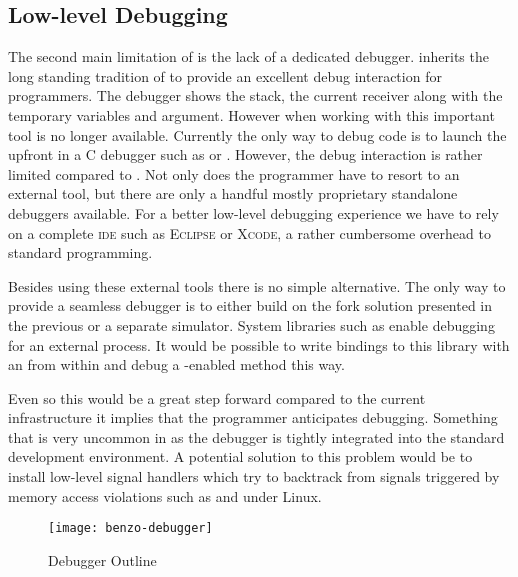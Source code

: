 \subsection{Low-level Debugging}
The second main limitation of \B is the lack of a dedicated debugger.
\PH inherits the long standing tradition of \ST to provide an excellent debug interaction for programmers.
The \PH debugger shows the stack, the current receiver along with the temporary variables and argument.
However when working with \B this important tool is no longer available.
Currently the only way to debug \B code is to launch the \VM upfront in a C debugger such as \GDB or \LLDB.
However, the debug interaction is rather limited compared to \PH.
Not only does the programmer have to resort to an external tool, but there are only a handful mostly proprietary standalone debuggers available.
For a better low-level debugging experience we have to rely on a complete \textsc{ide} such as \textsc{Eclipse} or \textsc{Xcode}, a rather cumbersome overhead to standard \PH programming.

Besides using these external tools there is no simple alternative.
The only way to provide a seamless debugger is to either build on the fork solution presented in the previous  or a separate simulator.
System libraries such as \ptrace enable debugging for an external process.
It would be possible to write bindings to this library with an \FFI from within \PH and debug a \B-enabled method this way.

Even so this would be a great step forward compared to the current infrastructure it implies that the programmer anticipates debugging.
Something that is very uncommon in \PH as the debugger is tightly integrated into the standard development environment.
A potential solution to this problem would be to install low-level signal handlers which try to backtrack from signals triggered by memory access violations such as  and  under Linux.

\begin{figure}[h]
	\centering
	\texttt{[image: benzo-debugger]}
	\caption{\B Debugger Outline}
\end{figure}

